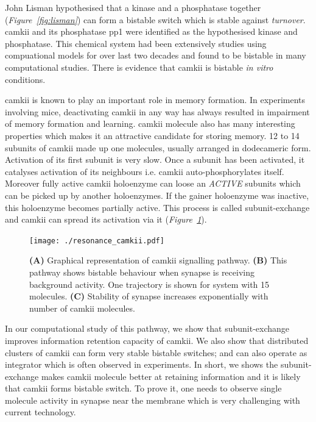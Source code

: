 \documentclass[]{resonance}
\newcommand\Fig[1]{\textit{Figure~\ref{#1}}}
\begin{document}
{John Lisman hypothesised that a kinase and a phosphatase together
(\Fig{fig:lisman}) can form a bistable switch which is stable against
\emph{turnover}. \gls{camkii} and its phosphatase \gls{pp1} were identified as
the hypothesised kinase and phosphatase. This chemical system had been
extensively studies using compuational models for over last two decades
\cite{sandstorm} and found to be bistable in many computational studies. There
is evidence that \gls{camkii} is bistable \emph{in vitro} conditions. 

\gls{camkii} is known to  play an important role in memory formation.  In
experiments involving mice, deactivating \gls{camkii} in any way has always
resulted in impairment of memory formation and learning. \gls{camkii} molecule
also has many interesting properties which makes it an attractive candidate for
storing memory. 12 to 14 subunits of \gls{camkii} made up one molecules, usually
arranged in dodecameric form. Activation of its first subunit is very slow. Once
a subunit has been activated, it catalyses activation of its neighbours i.e.
\gls{camkii} auto-phosphorylates itself. Moreover fully active \gls{camkii}
holoenzyme can loose an \textit{ACTIVE} subunits which can be picked up by
another holoenzymes. If the gainer holoenzyme was inactive, this holoenzyme
becomes partially active. This process is called subunit-exchange and
\gls{camkii} can spread its activation via it (\Fig{fig:camkii_summary}).

\begin{figure}[b!]
    \caption{ \textbf{(A)} Graphical representation of \gls{camkii} signalling
        pathway. \textbf{(B)} This pathway shows bistable behaviour when synapse
        is receiving background activity. One trajectory is shown for system with 
        15 molecules. \textbf{(C)} Stability of synapse increases exponentially
        with number of \gls{camkii} molecules.
    }\label{fig:camkii_summary}
    \centering
    \texttt{[image: ./resonance\_camkii.pdf]}
\end{figure}

In our computational study of this pathway, we show that subunit-exchange
improves information retention capacity of \gls{camkii}. We also show that
distributed clusters of \gls{camkii} can form very stable bistable switches; and
can also operate as integrator which is often observed in experiments. In short,
we shows the subunit-exchange makes \gls{camkii} molecule better at retaining
information and it is likely that \gls{camkii} forms bistable switch. To prove
it, one needs to observe single molecule activity in synapse near the membrane
which is very challenging with current technology.

}
\end{document}

